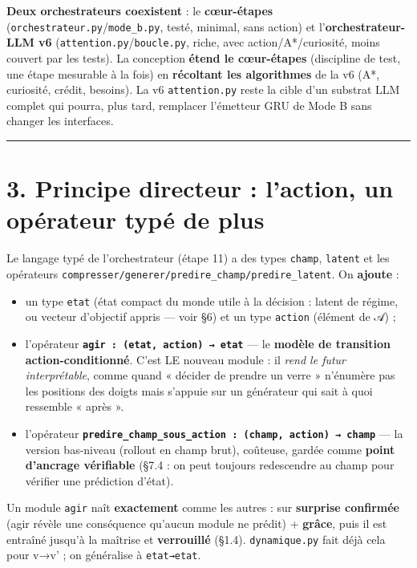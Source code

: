 \documentclass[
  french,
  11pt,
]{article}
\providecommand{\tightlist}{%
  \setlength{\itemsep}{0pt}\setlength{\parskip}{0pt}}
\begin{document}
\textbf{Deux orchestrateurs coexistent} : le \textbf{cœur-étapes}
(\texttt{orchestrateur.py}/\texttt{mode\_b.py}, testé, minimal, sans
action) et l'\textbf{orchestrateur-LLM v6}
(\texttt{attention.py}/\texttt{boucle.py}, riche, avec
action/A*/curiosité, moins couvert par les tests). La conception
\textbf{étend le cœur-étapes} (discipline de test, une étape mesurable à
la fois) en \textbf{récoltant les algorithmes} de la v6 (A*, curiosité,
crédit, besoins). La v6 \texttt{attention.py} reste la cible d'un
substrat LLM complet qui pourra, plus tard, remplacer l'émetteur GRU de
Mode B sans changer les interfaces.

\begin{center}\rule{0.5\linewidth}{0.5pt}\end{center}

\section{3. Principe directeur : l'action, un opérateur typé de
plus}\label{principe-directeur-laction-un-opuxe9rateur-typuxe9-de-plus}

Le langage typé de l'orchestrateur (étape 11) a des types
\texttt{champ}, \texttt{latent} et les opérateurs
\texttt{compresser/generer/predire\_champ/predire\_latent}. On
\textbf{ajoute} :

\begin{itemize}
\tightlist
\item
  un type \texttt{etat} (état compact du monde utile à la décision :
  latent de régime, ou vecteur d'objectif appris --- voir §6) et un type
  \texttt{action} (élément de 𝒜) ;
\item
  l'opérateur \textbf{\texttt{agir\ :\ (etat,\ action)\ →\ etat}} --- le
  \textbf{modèle de transition action-conditionné}. C'est LE nouveau
  module : il \emph{rend le futur interprétable}, comme quand « décider
  de prendre un verre » n'énumère pas les positions des doigts mais
  s'appuie sur un générateur qui sait à quoi ressemble « après ».
\item
  l'opérateur
  \textbf{\texttt{predire\_champ\_sous\_action\ :\ (champ,\ action)\ →\ champ}}
  --- la version bas-niveau (rollout en champ brut), coûteuse, gardée
  comme \textbf{point d'ancrage vérifiable} (§7.4 : on peut toujours
  redescendre au champ pour vérifier une prédiction d'état).
\end{itemize}

Un module \texttt{agir} naît \textbf{exactement} comme les autres : sur
\textbf{surprise confirmée} (agir révèle une conséquence qu'aucun module
ne prédit) + \textbf{grâce}, puis il est entraîné jusqu'à la maîtrise et
\textbf{verrouillé} (§1.4). \texttt{dynamique.py} fait déjà cela pour
v→v' ; on généralise à \texttt{etat→etat}.
\end{document}
